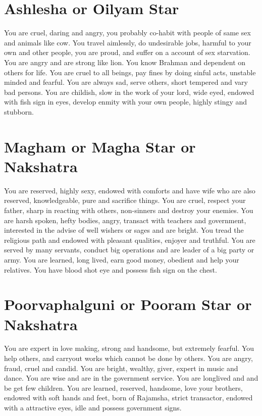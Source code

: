 \documentclass[12pt, right open]{memoir}
\begin{document}
\section{Ashlesha or Oilyam Star}

You are cruel, daring and angry, you probably co-habit with people of same sex and animals like cow. You travel aimlessly, do undesirable jobs, harmful to your own and other people, you are proud, and suffer on a account of sex starvation. You are angry and are strong like lion. You know Brahman and dependent on others for life. You are cruel to all beings, pay fines by doing sinful acts, unstable minded and fearful. You are always sad, serve others, short tempered and vary bad persons. You are childish, slow in the work of your lord, wide eyed, endowed with fish sign in eyes, develop enmity with your own people, highly stingy and stubborn.


\section{Magham or Magha Star or Nakshatra}

You are reserved, highly sexy, endowed with comforts and have wife who are also reserved, knowledgeable, pure and sacrifice things. You are cruel, respect your father, sharp in reacting with others, non-sinners and destroy your enemies. You are harsh spoken, hefty bodies, angry, transact with teachers and government, interested in the advise of well wishers or sages and are bright. You tread the religious path and endowed with pleasant qualities, enjoyer and truthful. You are served by many servants, conduct big operations and are leader of a big party or army. You are learned, long lived, earn good money, obedient and help your relatives. You have blood shot eye and possess fish sign on the chest.


\section{Poorvaphalguni or Pooram Star or Nakshatra}

You are expert in love making, strong and handsome, but extremely fearful. You help others, and carryout works which cannot be done by others. You are angry, fraud, cruel and candid. You are bright, wealthy, giver, expert in music and dance. You are wise and are in the government service. You are longlived and and be get few children. You are learned, reserved, handsome, love your brothers, endowed with soft hands and feet, born of Rajamsha, strict transactor, endowed with a attractive eyes, idle and possess government signs.
\end{document}
